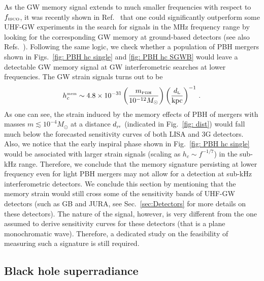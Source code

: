 \documentclass[11pt,a4paper]{article}
\newcommand{\lp }{\left (}
\newcommand{\rp }{\right )}
\newcommand{\PBH}{\text{\tiny PBH}}
\begin{document}
As the GW memory signal extends to much smaller frequencies with respect to $f_\text{\tiny ISCO}$, it was recently shown in Ref.~\cite{PhysRevLett.118.181103} that one could significantly outperform some UHF-GW experiments in the search for signals in the MHz frequency range by looking for the corresponding GW memory at ground-based detectors (see also Refs.~\cite{Domenech:2021odz,Lasky:2021naa}). 
Following the same logic, we check whether a population of PBH mergers shown in Figs.~\ref{fig: PBH hc single} and \ref{fig: PBH hc SGWB}
 would leave a detectable GW memory signal at GW interferometric searches at lower frequencies. 
The GW strain signals turns out to be 
\begin{equation}
h_c^\text{\tiny mem} \sim 4.8 \times 10^{-31} 
\lp \frac{m_\PBH}{10^{-12} M_\odot } \rp
\lp \frac{d_\text{\tiny L}}{\rm kpc} \rp ^{-1} \,.
\end{equation}
As one can see, the strain induced by the memory effects of PBH of mergers with masses $m \lesssim 10^{-4} M_\odot$ at a distance $d_\text{\tiny yr}$ (indicated in Fig.~\ref{fig: dist})  would fall much below the forecasted sensitivity curves of both LISA and 3G detectors. Also, we notice that the early inspiral phase shown in Fig.~\ref{fig: PBH hc single} would be associated with larger strain signals (scaling as $h_c \sim f^{-1/7}$) in the sub-kHz range. 
Therefore, we conclude that the memory signature persisting at lower frequency even for light PBH mergers may not allow for a detection at sub-kHz interferometric detectors.
We conclude this section by mentioning that the memory strain would still cross some of the sensitivity bands of UHF-GW detectors (such as GB and JURA, see Sec.~\ref{sec:Detectors} for more details on these detectors). The nature of the signal, however, is very different from the one assumed to derive sensitivity curves for these detectors (that is a plane monochromatic wave). 
Therefore, a dedicated study on the feasibility of measuring such a signature is still required.

\subsection{Black hole superradiance}
\label{sec:Superradiance}
\end{document}
